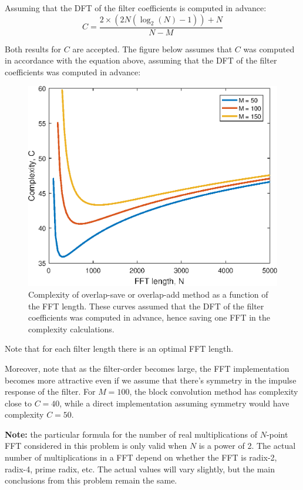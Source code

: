 \documentclass{article}
\begin{document}
Assuming that the DFT of the filter coefficients is computed in advance:
\begin{equation}
C = \frac{2\times (2N(\log_2(N)-1)) + N}{N-M} \tag{block convolution 2 FFTs}
\end{equation}

Both results for $C$ are accepted. The figure below assumes that $C$ was computed in accordance with the equation above, assuming that the DFT of the filter coefficients was computed in advance:

\FloatBarrier
\begin{figure}[h!]
	\centering
	\includegraphics[scale=0.8]{block_conv_complexity.eps}
	\caption{Complexity of overlap-save or overlap-add method as a function of the FFT length. These curves assumed that the DFT of the filter coefficients was computed in advance, hence saving one FFT in the complexity calculations.}
\end{figure}
\FloatBarrier

Note that for each filter length there is an optimal FFT length. 

Moreover, note that as the filter-order becomes large, the FFT implementation becomes more attractive even if we assume that there's symmetry in the impulse response of the filter. For $M = 100$, the block convolution method has complexity close to $C =40$, while a direct implementation assuming symmetry would have complexity $C = 50$.


\noindent\textbf{Note:} the particular formula for the number of real multiplications of $N$-point FFT considered in this problem is only valid when $N$ is a power of 2. The actual number of multiplications in a FFT depend on whether the FFT is radix-2, radix-4, prime radix, etc. The actual values will vary slightly, but the main conclusions from this problem remain the same. 
\end{document}
